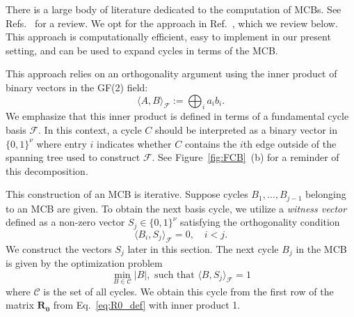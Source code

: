 \documentclass[fleqn,11pt]{article}
\newcommand\calF{\mathcal{F}}
\newcommand\calM{\mathcal{M}}
\newcommand\CycSp{\mathcal{C}}    %
\begin{document}
There is a large body of literature dedicated to the computation of MCBs. See Refs.~\cite{kavithaCycle2009,mehlhornMinimum2010} for a review. %
We opt for the approach in Ref.~\cite{kavithaFaster2004}, which we review below. This approach is computationally efficient, easy to implement in our present setting, and can be used to expand cycles in terms of the MCB.

This approach relies on an orthogonality argument using the inner product of binary vectors in the GF(2) field:
\begin{equation}
	\langle A,B\rangle_\mathcal{F} := \bigoplus_i a_i b_i.
\end{equation} 
We emphasize that this inner product is defined in terms of a fundamental cycle basis $\calF$. In this context, a cycle $C$ should be interpreted as a binary vector in $\{0,1\}^\nu$ where entry $i$ indicates whether $C$ contains the $i$th edge outside of the spanning tree used to construct $\calF$.
See Figure~\ref{fig:FCB}~(b) for a reminder of this decomposition.



This construction of an MCB is iterative. Suppose cycles $B_1,\hdots, B_{j-1}$ belonging to an MCB are given. 
To obtain the next basis cycle, we utilize a \emph{witness vector} defined as a non-zero vector $S_j\in\{0,1\}^\nu$ satisfying the orthogonality condition
\begin{equation}
	\langle B_i, S_j\rangle_\calF = 0,\quad i<j.
	\label{eq:Wit_Orth}
\end{equation}
{We construct the vectors $S_j$ later in this section.}
The next cycle $B_j$ in the MCB is given by the optimization problem
\begin{equation}
	\min_{B\in\CycSp} |B|,\text{ such that }\langle{B,S_j}\rangle_\calF =1
	\label{eq:len_const_opt}
\end{equation}
where $\CycSp$ is the set of all cycles. 
We obtain this cycle from the first row of the matrix $\bm{R_0}$ from Eq.~\eqref{eq:R0_def} with inner product 1.
\end{document}
